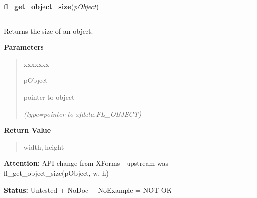 \hspace{.8\funcindent}\begin{boxedminipage}{\funcwidth}

    \raggedright \textbf{fl\_get\_object\_size}(\textit{pObject})

    \vspace{-1.5ex}

    \rule{\textwidth}{0.5\fboxrule}
\setlength{\parskip}{2ex}
    Returns the size of an object.

\setlength{\parskip}{1ex}
      \textbf{Parameters}
      \vspace{-1ex}

      \begin{quote}
        \begin{Ventry}{xxxxxxx}

          \item[pObject]

          pointer to object

            {\it (type=pointer to xfdata.FL\_OBJECT)}

        \end{Ventry}

      \end{quote}

      \textbf{Return Value}
    \vspace{-1ex}

      \begin{quote}
      width, height

      \end{quote}

\textbf{Attention:} API change from XForms - upstream was fl\_get\_object\_size(pObject, w, h)



\textbf{Status:} Untested + NoDoc + NoExample = NOT OK



    \end{boxedminipage}

    \label{xformslib:library:fl_set_object_size}

    \vspace{0.5ex}

